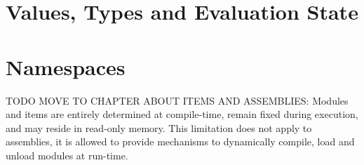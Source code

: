 \section{Values, Types and Evaluation State}



\section{Namespaces}


TODO MOVE TO CHAPTER ABOUT ITEMS AND ASSEMBLIES: Modules and items are entirely determined at compile-time, remain fixed during execution, and may reside in read-only memory. This limitation does not apply to assemblies, it is allowed to provide mechanisms to dynamically compile, load and unload modules at run-time.

